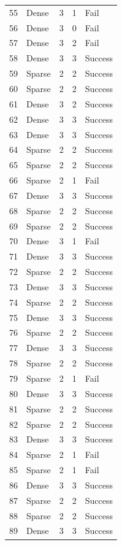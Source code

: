 \documentclass[../main.tex]{subfiles}
\begin{document}
\begin{center}
\begin{longtable}{|c|l|c|c|l|}
    55 & Dense & 3 & 1 & Fail \\
    56 & Dense & 3 & 0 & Fail \\
    57 & Dense & 3 & 2 & Fail \\
    58 & Dense & 3 & 3 & Success \\
    59 & Sparse & 2 & 2 & Success \\
    60 & Sparse & 2 & 2 & Success \\
    61 & Dense & 3 & 2 & Success \\
    62 & Dense & 3 & 3 & Success \\
    63 & Dense & 3 & 3 & Success \\
    64 & Sparse & 2 & 2 & Success \\
    65 & Sparse & 2 & 2 & Success \\
    66 & Sparse & 2 & 1 & Fail \\
    67 & Dense & 3 & 3 & Success \\
    68 & Sparse & 2 & 2 & Success \\
    69 & Sparse & 2 & 2 & Success \\
    70 & Dense & 3 & 1 & Fail \\
    71 & Dense & 3 & 3 & Success \\
    72 & Sparse & 2 & 2 & Success \\
    73 & Dense & 3 & 3 & Success \\
    74 & Sparse & 2 & 2 & Success \\
    75 & Dense & 3 & 3 & Success \\
    76 & Sparse & 2 & 2 & Success \\
    77 & Dense & 3 & 3 & Success \\
    78 & Sparse & 2 & 2 & Success \\
    79 & Sparse & 2 & 1 & Fail \\
    80 & Dense & 3 & 3 & Success \\
    81 & Sparse & 2 & 2 & Success \\
    82 & Sparse & 2 & 2 & Success \\
    83 & Dense & 3 & 3 & Success \\
    84 & Sparse & 2 & 1 & Fail \\
    85 & Sparse & 2 & 1 & Fail \\
    86 & Dense & 3 & 3 & Success \\
    87 & Sparse & 2 & 2 & Success \\
    88 & Sparse & 2 & 2 & Success \\
    89 & Dense & 3 & 3 & Success \\

\end{longtable}
\end{center}
\end{document}
